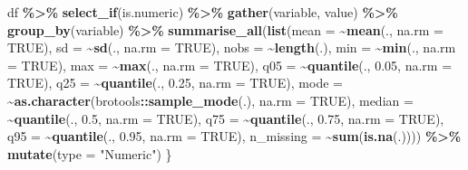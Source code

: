 \documentclass[
]{article}
\newenvironment{Shaded}{\begin{snugshade}}{\end{snugshade}}
\newcommand{\DataTypeTok}[1]{\textcolor[rgb]{0.13,0.29,0.53}{#1}}
\newcommand{\FloatTok}[1]{\textcolor[rgb]{0.00,0.00,0.81}{#1}}
\newcommand{\KeywordTok}[1]{\textcolor[rgb]{0.13,0.29,0.53}{\textbf{#1}}}
\newcommand{\NormalTok}[1]{#1}
\newcommand{\OperatorTok}[1]{\textcolor[rgb]{0.81,0.36,0.00}{\textbf{#1}}}
\newcommand{\OtherTok}[1]{\textcolor[rgb]{0.56,0.35,0.01}{#1}}
\newcommand{\StringTok}[1]{\textcolor[rgb]{0.31,0.60,0.02}{#1}}
\begin{document}
\begin{Shaded}
\begin{Highlighting}[]
\NormalTok{    df }\OperatorTok{\%\textgreater{}\%}
\StringTok{        }\KeywordTok{select\_if}\NormalTok{(is.numeric) }\OperatorTok{\%\textgreater{}\%}
\StringTok{        }\KeywordTok{gather}\NormalTok{(variable, value) }\OperatorTok{\%\textgreater{}\%}
\StringTok{        }\KeywordTok{group\_by}\NormalTok{(variable) }\OperatorTok{\%\textgreater{}\%}
\StringTok{        }\KeywordTok{summarise\_all}\NormalTok{(}\KeywordTok{list}\NormalTok{(}\DataTypeTok{mean =} \OperatorTok{\textasciitilde{}}\KeywordTok{mean}\NormalTok{(., }\DataTypeTok{na.rm =} \OtherTok{TRUE}\NormalTok{),}
                           \DataTypeTok{sd =} \OperatorTok{\textasciitilde{}}\KeywordTok{sd}\NormalTok{(., }\DataTypeTok{na.rm =} \OtherTok{TRUE}\NormalTok{),}
                           \DataTypeTok{nobs =} \OperatorTok{\textasciitilde{}}\KeywordTok{length}\NormalTok{(.),}
                           \DataTypeTok{min =} \OperatorTok{\textasciitilde{}}\KeywordTok{min}\NormalTok{(., }\DataTypeTok{na.rm =} \OtherTok{TRUE}\NormalTok{),}
                           \DataTypeTok{max =} \OperatorTok{\textasciitilde{}}\KeywordTok{max}\NormalTok{(., }\DataTypeTok{na.rm =} \OtherTok{TRUE}\NormalTok{),}
                           \DataTypeTok{q05 =} \OperatorTok{\textasciitilde{}}\KeywordTok{quantile}\NormalTok{(., }\FloatTok{0.05}\NormalTok{, }\DataTypeTok{na.rm =} \OtherTok{TRUE}\NormalTok{),}
                           \DataTypeTok{q25 =} \OperatorTok{\textasciitilde{}}\KeywordTok{quantile}\NormalTok{(., }\FloatTok{0.25}\NormalTok{, }\DataTypeTok{na.rm =} \OtherTok{TRUE}\NormalTok{),}
                           \DataTypeTok{mode =} \OperatorTok{\textasciitilde{}}\KeywordTok{as.character}\NormalTok{(brotools}\OperatorTok{::}\KeywordTok{sample\_mode}\NormalTok{(.), }\DataTypeTok{na.rm =} \OtherTok{TRUE}\NormalTok{),}
                           \DataTypeTok{median =} \OperatorTok{\textasciitilde{}}\KeywordTok{quantile}\NormalTok{(., }\FloatTok{0.5}\NormalTok{, }\DataTypeTok{na.rm =} \OtherTok{TRUE}\NormalTok{),}
                           \DataTypeTok{q75 =} \OperatorTok{\textasciitilde{}}\KeywordTok{quantile}\NormalTok{(., }\FloatTok{0.75}\NormalTok{, }\DataTypeTok{na.rm =} \OtherTok{TRUE}\NormalTok{),}
                           \DataTypeTok{q95 =} \OperatorTok{\textasciitilde{}}\KeywordTok{quantile}\NormalTok{(., }\FloatTok{0.95}\NormalTok{, }\DataTypeTok{na.rm =} \OtherTok{TRUE}\NormalTok{),}
                           \DataTypeTok{n\_missing =} \OperatorTok{\textasciitilde{}}\KeywordTok{sum}\NormalTok{(}\KeywordTok{is.na}\NormalTok{(.)))) }\OperatorTok{\%\textgreater{}\%}
\StringTok{        }\KeywordTok{mutate}\NormalTok{(}\DataTypeTok{type =} \StringTok{"Numeric"}\NormalTok{)}
\NormalTok{\}}


\end{Highlighting}
\end{Shaded}
\end{document}
